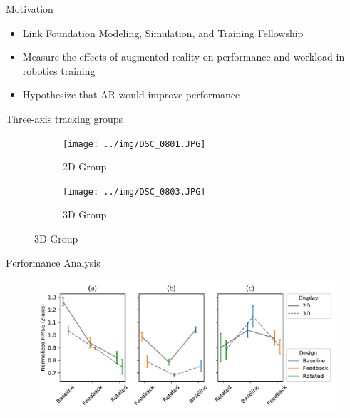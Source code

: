 \documentclass[10pt]{beamer}
\begin{document}
\begin{frame}[fragile]{Motivation}
  \begin{itemize}
    \setlength\itemsep{1em}
    \item Link Foundation Modeling, Simulation, and Training Fellowship
    \item Measure the effects of augmented reality on performance and workload in robotics training
    \item Hypothesize that AR would improve performance
  \end{itemize}
\end{frame}

\begin{frame}[fragile]{Three-axis tracking groups}
  \begin{figure}
    \begin{center}
      \begin{subfigure}{0.49\textwidth}
        \texttt{[image: ../img/DSC\_0801.JPG]}
        \caption{2D Group}
      \end{subfigure}\hfill
      \begin{subfigure}{0.49\textwidth}
        \texttt{[image: ../img/DSC\_0803.JPG]}
        \caption{3D Group}
      \end{subfigure}
    \end{center}
  \end{figure}
\end{frame}

\begin{frame}[fragile]{Performance Analysis}
\begin{figure}
  \begin{center}
    \includegraphics[width=\linewidth]{../img/x_design_y_zrmse_col_startdesign_hue_device.pdf}
  \end{center}
\end{figure}
\end{frame}
\end{document}
